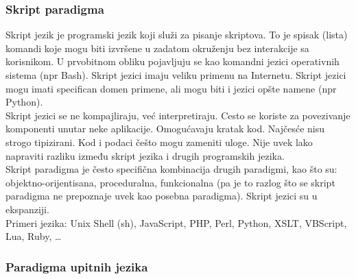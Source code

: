 \documentclass[../main.tex]{subfiles}
\begin{document}
\subsubsection{Skript paradigma}												

Skript jezik je programski jezik koji služi za pisanje skriptova. To je spisak (lista) komandi koje mogu biti izvršene u zadatom okruženju bez interakcije sa korisnikom. U prvobitnom obliku pojavljuju se kao komandni jezici operativnih sistema (npr Bash). Skript jezici imaju veliku primenu na Internetu. Skript jezici mogu imati specifican domen primene, ali mogu biti i jezici opšte namene (npr Python).\\
Skript jezici se ne kompajliraju, već interpretiraju. Cesto se koriste za povezivanje komponenti unutar neke aplikacije. Omogućavaju kratak kod. Najčesće nisu strogo tipizirani. Kod i podaci češto mogu zameniti uloge. Nije uvek lako napraviti razliku između skript jezika i drugih programskih jezika. \\
Skript paradigma je često specifična kombinacija drugih paradigmi, kao što su: objektno-orijentisana, proceduralna, funkcionalna (pa je to razlog što se skript paradigma ne prepoznaje uvek kao posebna paradigma). Skript jezici su u ekspanziji.\\
Primeri jezika: Unix Shell (sh), JavaScript, PHP, Perl, Python, XSLT, VBScript, Lua, Ruby, \ldots

\subsubsection{Paradigma upitnih jezika}											
\end{document}

